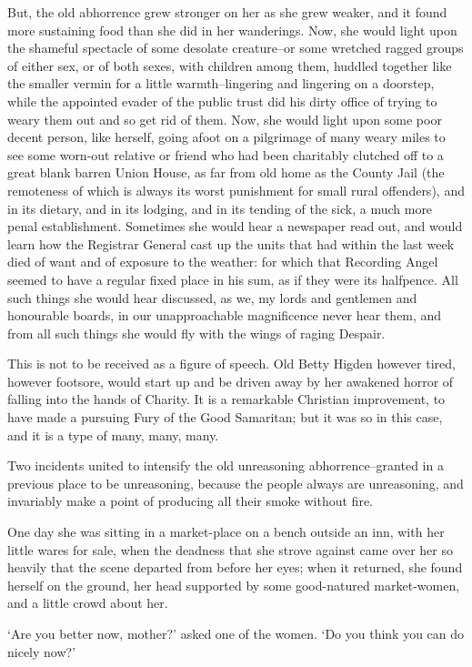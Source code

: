But, the old abhorrence grew stronger on her as she grew weaker, and
it found more sustaining food than she did in her wanderings. Now, she
would light upon the shameful spectacle of some desolate creature--or
some wretched ragged groups of either sex, or of both sexes, with
children among them, huddled together like the smaller vermin for
a little warmth--lingering and lingering on a doorstep, while the
appointed evader of the public trust did his dirty office of trying to
weary them out and so get rid of them. Now, she would light upon some
poor decent person, like herself, going afoot on a pilgrimage of
many weary miles to see some worn-out relative or friend who had been
charitably clutched off to a great blank barren Union House, as far from
old home as the County Jail (the remoteness of which is always its worst
punishment for small rural offenders), and in its dietary, and in
its lodging, and in its tending of the sick, a much more penal
establishment. Sometimes she would hear a newspaper read out, and would
learn how the Registrar General cast up the units that had within the
last week died of want and of exposure to the weather: for which that
Recording Angel seemed to have a regular fixed place in his sum, as if
they were its halfpence. All such things she would hear discussed, as
we, my lords and gentlemen and honourable boards, in our unapproachable
magnificence never hear them, and from all such things she would fly
with the wings of raging Despair.

This is not to be received as a figure of speech. Old Betty Higden
however tired, however footsore, would start up and be driven away
by her awakened horror of falling into the hands of Charity. It is a
remarkable Christian improvement, to have made a pursuing Fury of the
Good Samaritan; but it was so in this case, and it is a type of many,
many, many.

Two incidents united to intensify the old unreasoning
abhorrence--granted in a previous place to be unreasoning, because the
people always are unreasoning, and invariably make a point of producing
all their smoke without fire.

One day she was sitting in a market-place on a bench outside an inn,
with her little wares for sale, when the deadness that she strove
against came over her so heavily that the scene departed from before
her eyes; when it returned, she found herself on the ground, her head
supported by some good-natured market-women, and a little crowd about
her.

‘Are you better now, mother?’ asked one of the women. ‘Do you think you
can do nicely now?’


